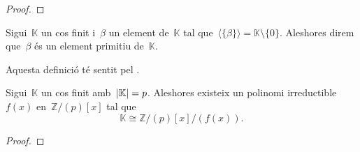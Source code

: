 \documentclass[../estructures-algebraiques.tex]{subfiles}
\begin{document}
    \begin{proof}
    \end{proof}
    \begin{definition}
        \label{def:element-primitiu-dun-cos-finit}
        Sigui~\(\mathbb{K}\) un cos finit i~\(\beta\) un element de~\(\mathbb{K}\) tal que~\(\langle\{\beta\}\rangle=\mathbb{K}\setminus\{0\}\).
        Aleshores direm que~\(\beta\) és un element primitiu de~\(\mathbb{K}\).

        Aquesta definició té sentit pel .
    \end{definition}
    \begin{theorem}
        Sigui~\(\mathbb{K}\) un cos finit amb~\(\abs{\mathbb{K}}=p\).
        Aleshores existeix un polinomi irreductible~\(f(x)\) en~\(\mathbb{Z}/(p)[x]\) tal que
        \[
            \mathbb{K}\cong\mathbb{Z}/(p)[x]/(f(x)).
        \]
    \end{theorem}
    \begin{proof}
    \end{proof}
\end{document}
